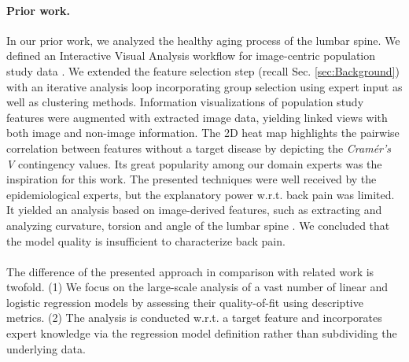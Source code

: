 \documentclass[journal]{style/vgtc} 			          %
\begin{document}
\paragraph{Prior work.}
In our prior work, we analyzed the healthy aging process of the lumbar spine.
We defined an Interactive Visual Analysis workflow for image-centric population study data \cite{Klemm2014VIS}.
We extended the feature selection step (recall Sec. \ref{sec:Background}) with an iterative analysis loop incorporating group selection using expert input as well as clustering methods.
Information visualizations of population study features were augmented with extracted image data, yielding linked views with both image and non-image information.
The 2D heat map \cite{Klemm2014VIS} highlights the pairwise correlation between features without a target disease by depicting the \emph{Cram\'{e}r's V} contingency values.
Its great popularity among our domain experts was the inspiration for this work.
The presented techniques were well received by the epidemiological experts, but the explanatory power w.r.t. back pain was limited.
It yielded an analysis based on image-derived features, such as extracting and analyzing curvature, torsion and angle of the lumbar spine \cite{Klemm2015}.
We concluded that the model quality is insufficient to characterize back pain.
\\\\
The difference of the presented approach in comparison with related work is twofold.
(1) We focus on the large-scale analysis of a vast number of linear and logistic regression models by assessing their quality-of-fit using descriptive metrics.
(2) The analysis is conducted w.r.t. a target feature and incorporates expert knowledge via the regression model definition rather than subdividing the underlying data.
\end{document}

